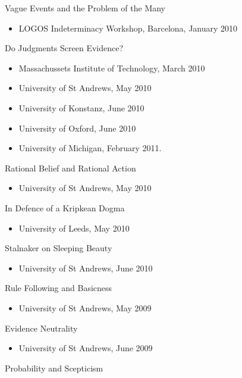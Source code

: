\documentclass[
  10pt,
  letterpaper,
  DIV=11,
  numbers=noendperiod,
  twoside]{scrartcl}
\providecommand{\tightlist}{%
  \setlength{\itemsep}{0pt}\setlength{\parskip}{0pt}}\usepackage{longtable,booktabs,array}
\begin{document}
Vague Events and the Problem of the Many

\begin{itemize}
\tightlist
\item
  LOGOS Indeterminacy Workshop, Barcelona, January 2010
\end{itemize}

Do Judgments Screen Evidence?

\begin{itemize}
\tightlist
\item
  Massachussets Institute of Technology, March 2010
\item
  University of St Andrews, May 2010
\item
  University of Konstanz, June 2010
\item
  University of Oxford, June 2010
\item
  University of Michigan, February 2011.
\end{itemize}

Rational Belief and Rational Action

\begin{itemize}
\tightlist
\item
  University of St Andrews, May 2010
\end{itemize}

In Defence of a Kripkean Dogma

\begin{itemize}
\tightlist
\item
  University of Leeds, May 2010
\end{itemize}

Stalnaker on Sleeping Beauty

\begin{itemize}
\tightlist
\item
  University of St Andrews, June 2010
\end{itemize}

Rule Following and Basicness

\begin{itemize}
\tightlist
\item
  University of St Andrews, May 2009
\end{itemize}

Evidence Neutrality

\begin{itemize}
\tightlist
\item
  University of St Andrews, June 2009
\end{itemize}

Probability and Scepticism
\end{document}
